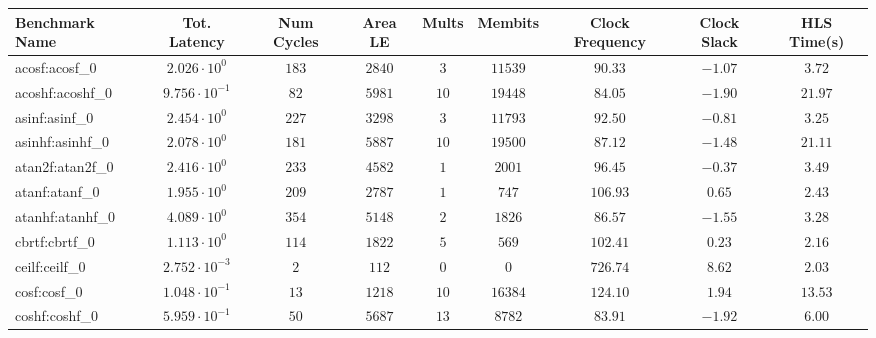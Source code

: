 \begin{tabular}{|l|c|c|c|c|c|c|c|c|}
\hline
Benchmark Name               & Tot. Latency            & Num Cycles & Area LE   & Mults   & Membits    & Clock Frequency & Clock Slack & HLS Time(s) \\
\hline
acosf:acosf\_0               & $ 2.026 \cdot 10^{0}  $ & $ 183    $ & $ 2840  $ & $ 3   $ & $ 11539  $ & $ 90.33       $ & $ -1.07   $ & $ 3.72    $ \\
acoshf:acoshf\_0             & $ 9.756 \cdot 10^{-1} $ & $ 82     $ & $ 5981  $ & $ 10  $ & $ 19448  $ & $ 84.05       $ & $ -1.90   $ & $ 21.97   $ \\
asinf:asinf\_0               & $ 2.454 \cdot 10^{0}  $ & $ 227    $ & $ 3298  $ & $ 3   $ & $ 11793  $ & $ 92.50       $ & $ -0.81   $ & $ 3.25    $ \\
asinhf:asinhf\_0             & $ 2.078 \cdot 10^{0}  $ & $ 181    $ & $ 5887  $ & $ 10  $ & $ 19500  $ & $ 87.12       $ & $ -1.48   $ & $ 21.11   $ \\
atan2f:atan2f\_0             & $ 2.416 \cdot 10^{0}  $ & $ 233    $ & $ 4582  $ & $ 1   $ & $ 2001   $ & $ 96.45       $ & $ -0.37   $ & $ 3.49    $ \\
atanf:atanf\_0               & $ 1.955 \cdot 10^{0}  $ & $ 209    $ & $ 2787  $ & $ 1   $ & $ 747    $ & $ 106.93      $ & $ 0.65    $ & $ 2.43    $ \\
atanhf:atanhf\_0             & $ 4.089 \cdot 10^{0}  $ & $ 354    $ & $ 5148  $ & $ 2   $ & $ 1826   $ & $ 86.57       $ & $ -1.55   $ & $ 3.28    $ \\
cbrtf:cbrtf\_0               & $ 1.113 \cdot 10^{0}  $ & $ 114    $ & $ 1822  $ & $ 5   $ & $ 569    $ & $ 102.41      $ & $ 0.23    $ & $ 2.16    $ \\
ceilf:ceilf\_0               & $ 2.752 \cdot 10^{-3} $ & $ 2      $ & $ 112   $ & $ 0   $ & $ 0      $ & $ 726.74      $ & $ 8.62    $ & $ 2.03    $ \\
cosf:cosf\_0                 & $ 1.048 \cdot 10^{-1} $ & $ 13     $ & $ 1218  $ & $ 10  $ & $ 16384  $ & $ 124.10      $ & $ 1.94    $ & $ 13.53   $ \\
coshf:coshf\_0               & $ 5.959 \cdot 10^{-1} $ & $ 50     $ & $ 5687  $ & $ 13  $ & $ 8782   $ & $ 83.91       $ & $ -1.92   $ & $ 6.00    $ \\

\end{tabular}

